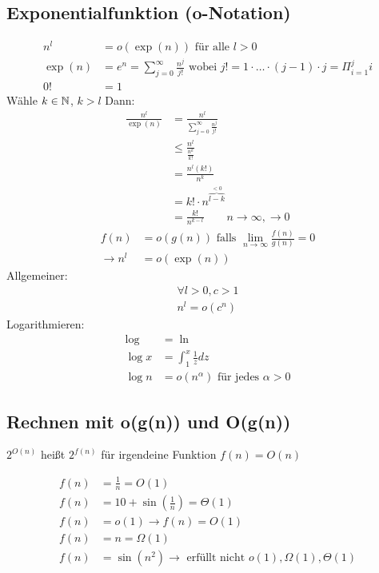\subsection{Exponentialfunktion (o-Notation)}
\begin{align*}
    n^l &= o(\exp(n)) \text{ für alle } l > 0\\
    \exp(n) &= e^n = \sum_{j = 0}^{\infty} \frac{n^j}{j!} \text{ wobei } j! = 1 \cdot \dots \cdot (j-1) \cdot j = \Pi_{i = 1}^j i\\
    0! &= 1
\end{align*} 
Wähle $k \in \mathbb N$, $k > l$ Dann:
\begin{align*}
    \frac{n^l}{\exp(n)} &= \frac{n^l}{\sum_{j = 0}^{\infty} \frac{n^j}{j!}}\\
    &\leq \frac{n^l}{\frac{n^k}{k!}}\\
    &= \frac{n^l(k!)}{n^k}\\
    &= k! \cdot n^{\overbrace{l - k}^{< 0}}\\
    &= \frac{k!}{n^{k - l}} \hspace{2em} n \rightarrow \infty, \rightarrow 0
\end{align*}
\begin{align*}
    f(n) &= o(g(n)) \text{ falls } \lim_{n \rightarrow \infty} \frac{f(n)}{g(n)} = 0\\
    \rightarrow n^l &= o(\exp(n))
\end{align*}
Allgemeiner:
\begin{align*}
    \forall l > 0, c > 1\\
    n^l = o(c^n)
\end{align*}
Logarithmieren:
\begin{align*}
    \log &= \ln\\
    \log x &= \int_{1}^x \frac{1}{z} dz\\
    \log n &= o(n^\alpha) \text{ für jedes } \alpha > 0
\end{align*}




\subsection{Rechnen mit o(g(n)) und O(g(n))}
$2^{O(n)}$ heißt $2^{f(n)}$ für irgendeine Funktion $f(n) = O(n)$

\begin{align*}
    f(n) &= \frac{1}{n} = O(1)\\
    f(n) &= 10 + \sin(\frac{1}{n}) = \Theta(1)\\
    f(n) &= o(1) \rightarrow f(n) = O(1)\\
    f(n) &= n = \Omega(1)\\
    f(n) &= \sin(n^2) \rightarrow \text{ erfüllt nicht } o(1), \Omega(1), \Theta(1)
\end{align*}

